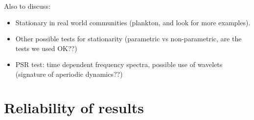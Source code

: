 
Also to discuss:
\begin{itemize}
	\item Stationary in real world communities (plankton, and look for more examples).
	\item Other possible tests for stationarity (parametric vs non-parametric, are the tests we used OK??)
	\item PSR test: time dependent frequency spectra, possible use of wavelets (signature of aperiodic dynamics??)
\end{itemize}


%
%





\section{Reliability of results}
\label{sec:reliability}

